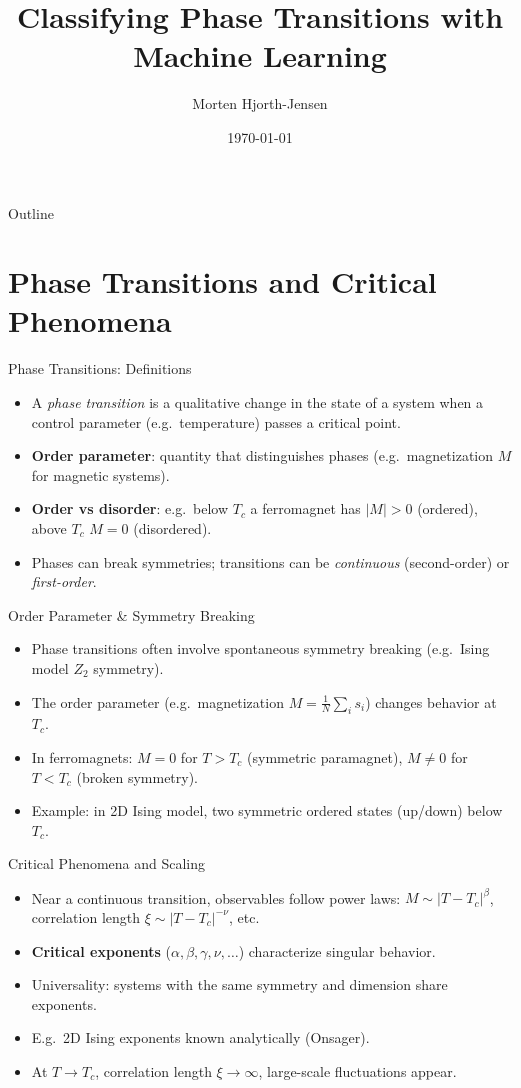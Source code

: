 \documentclass{beamer}
\title{Classifying Phase Transitions with Machine Learning}
\author{Morten Hjorth-Jensen}
\date{\today}
\begin{document}
\begin{frame}
 \titlepage
\end{frame}

\begin{frame}{Outline}
 \tableofcontents
\end{frame}

\section{Phase Transitions and Critical Phenomena}

\begin{frame}{Phase Transitions: Definitions}
 \begin{itemize}
   \item A \emph{phase transition} is a qualitative change in the state of a system when a control parameter (e.g.\ temperature) passes a critical point.
   \item \textbf{Order parameter}: quantity that distinguishes phases (e.g.\ magnetization $M$ for magnetic systems).
   \item \textbf{Order vs disorder}: e.g.\ below $T_c$ a ferromagnet has $|M|>0$ (ordered), above $T_c$ $M=0$ (disordered).
   \item Phases can break symmetries; transitions can be \emph{continuous} (second-order) or \emph{first-order}.
 \end{itemize}
\end{frame}

\begin{frame}{Order Parameter \& Symmetry Breaking}
 \begin{itemize}
   \item Phase transitions often involve spontaneous symmetry breaking (e.g.\ Ising model $Z_2$ symmetry).
   \item The order parameter (e.g.\ magnetization $M = \frac{1}{N}\sum_i s_i$) changes behavior at $T_c$.
   \item In ferromagnets: $M=0$ for $T>T_c$ (symmetric paramagnet), $M\neq 0$ for $T<T_c$ (broken symmetry).
   \item Example: in 2D Ising model, two symmetric ordered states (up/down) below $T_c$.
 \end{itemize}
\end{frame}

\begin{frame}{Critical Phenomena and Scaling}
 \begin{itemize}
   \item Near a continuous transition, observables follow power laws: $M \sim |T-T_c|^\beta$, correlation length $\xi \sim |T-T_c|^{-\nu}$, etc.
   \item \textbf{Critical exponents} ($\alpha,\beta,\gamma,\nu,\dots$) characterize singular behavior.
   \item Universality: systems with the same symmetry and dimension share exponents.
   \item E.g.\ 2D Ising exponents known analytically (Onsager).
   \item At $T\to T_c$, correlation length $\xi\to\infty$, large-scale fluctuations appear.
 \end{itemize}
\end{frame}
\end{document}
